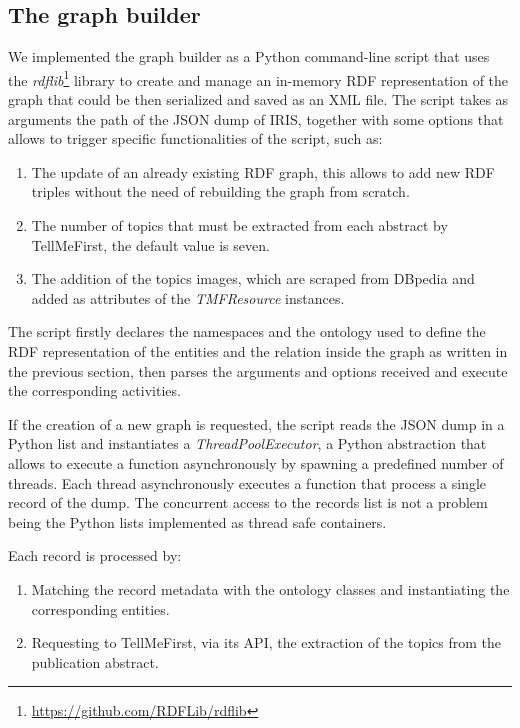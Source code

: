 \documentclass[%
    corpo=13.5pt,
    twoside,
    oldstyle,
    tipotesi=magistrale,
    greek,
    evenboxes
]{toptesi}
\begin{document}
\subsection{The graph builder}

We implemented the graph builder as a Python command-line script that uses
the \emph{rdflib}\footnote{\url{https://github.com/RDFLib/rdflib}} library
to create and manage an in-memory RDF representation of the graph that could be
then serialized and saved as an XML file.
The script takes as arguments the path of the JSON dump of IRIS, together
with some options that allows to trigger specific functionalities of the
script, such as:

\begin{enumerate}
    \item The update of an already existing RDF graph, this allows to add new
        RDF triples without the need of rebuilding the graph from scratch.
    \item The number of topics that must be extracted from each abstract by
        TellMeFirst, the default value is seven.
    \item The addition of the topics images, which are scraped from DBpedia and
        added as attributes of the \emph{TMFResource} instances.
\end{enumerate}

The script firstly declares the namespaces and the ontology used to define the
RDF representation of the entities and the relation inside the graph as written
in the previous section, then parses the arguments and options received and
execute the corresponding activities.

If the creation of a new graph is requested, the script reads the JSON dump
in a Python list and instantiates a \emph{ThreadPoolExecutor}, a Python
abstraction that allows to execute a function asynchronously by spawning
a predefined number of threads.
Each thread asynchronously executes a function that process a single record of
the dump.
The concurrent access to the records list is not a problem being the Python
lists implemented as thread safe containers.

Each record is processed by:

\begin{enumerate}
    \item Matching the record metadata with the ontology classes and
        instantiating the corresponding entities.
    \item Requesting to TellMeFirst, via its API, the extraction of the topics
        from the publication abstract.
\end{enumerate}
\end{document}
